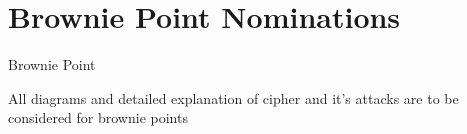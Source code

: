\section{Brownie Point Nominations}

\begin{frame}{Brownie Point}

\item All diagrams and detailed explanation of cipher and it's attacks are to be considered for brownie points



\end{frame}

